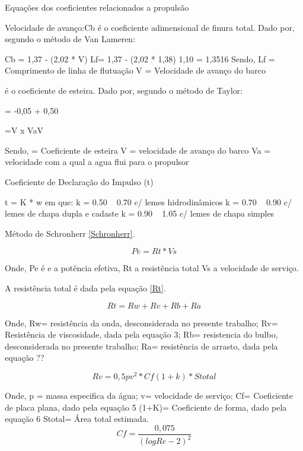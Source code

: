 Equações dos coeficientes relacionados a propulsão

Velocidade de avanço:Cb é o coeficiente adimensional de finura total. Dado por, segundo o método de Van Lameren:

Cb = 1,37 - (2,02 * V) Lf= 1,37 - (2,02 * 1,38) 1,10 = 1,3516
Sendo, 
Lf = Comprimento de linha de flutuação
V = Velocidade de avanço do barco

é o coeficiente de esteira. Dado por, segundo o método de Taylor:

= -0,05 + 0,50 

=V x VaV 

Sendo, 
= Coeficiente de esteira
V = velocidade de avanço do barco
Va = velocidade com a qual a agua flui para o propulsor



Coeficiente de Declaração do Impulso (t)

t = K * w                       em que: k = 0.50 ~ 0.70 c/ lemes hidrodinâmicos
k = 0.70 ~ 0.90 c/ lemes de chapa dupla e cadaste 
k = 0.90 ~ 1.05 c/ lemes de chapa simples

Método de Schronherr \ref{Schronherr}. 

\begin{equation} \label{Schronherr}
	Pe=Rt*Vs
\end{equation}
 

Onde,
Pe é e a potência efetiva, 
Rt a resistência total 
Vs a velocidade de serviço.

A resistência total é dada pela equação \ref{Rt}. 

\begin{equation} \label{Rt}
   Rt=Rw+Rv+Rb+Ra 
\end{equation}
 

Onde, 
Rw= resistência da onda, desconsiderada no presente trabalho;
Rv= Resistência de viscosidade, dada pela equação 3;
Rb= resistencia do bulbo, desconsiderada no presente trabalho;
Ra= resistência de arrasto, dada pela equação ??

\begin{equation} \label{Rv}
   Rv = 0,5pv^2 * Cf(1+k)*Stotal
\end{equation}
 

Onde, 
p = massa especifica da água;
v= velocidade de serviço;
Cf= Coeficiente de placa plana, dado pela equação 5
(1+K)= Coeficiente de forma, dado pela equação 6
Stotal= Área total estimada.
\begin{equation}
	Cf=\frac{0,075}{(log Re-2)^2}
\end{equation}
               

